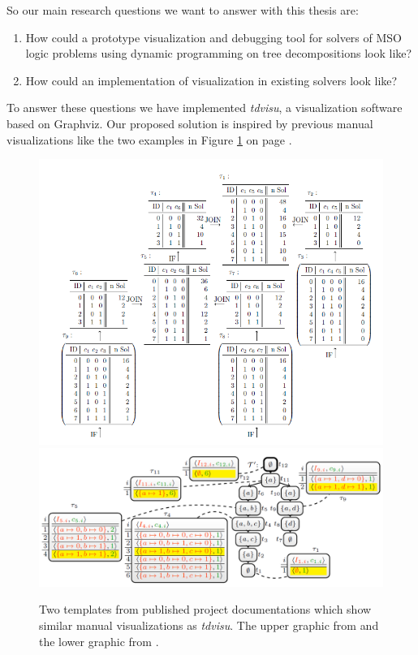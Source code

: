 \documentclass[a4paper, 12pt, bibliography=totoc]{scrartcl}
\begin{document}
So our main research questions we want to answer with this thesis are:
\begin{enumerate}
	\item How could a prototype visualization and debugging tool for solvers of MSO logic problems using dynamic programming on tree decompositions look like?
	\item How could an implementation of visualization in existing solvers look like?
\end{enumerate}
\noindent
To answer these questions we have implemented \textit{tdvisu}, a visualization software based on {Graphviz}. 
Our proposed solution is inspired by previous manual visualizations like the two examples in Figure \ref{fig:prevvisus} on page \pageref{fig:prevvisus}.
\begin{figure}[H]
	
	\centering
		\includegraphics[width=0.9\linewidth,valign=c]{images/DualDA43.png} \\
		
		\includegraphics[width=1\linewidth,valign=c]{images/dpdbVisuSat.png}\\ 
	
	\caption[Examples from previous manual visualization]{Two templates from published project documentations which show similar manual visualizations as \textit{tdvisu}. The upper graphic from \cite[Figure 4.3, page 29]{DiplomarbeitZisser} and the lower graphic from \cite[Figure 2, page 4]{dpdbpadl2020}.}
	\label{fig:prevvisus}
\end{figure}
\end{document}
